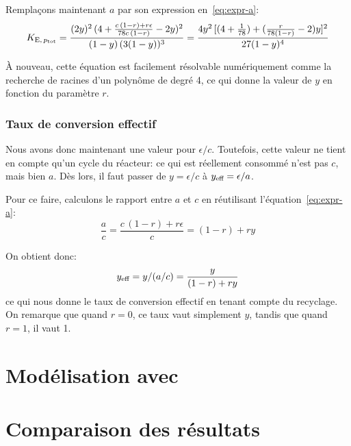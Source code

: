 Remplaçons maintenant $a$ par son expression en~\ref{eq:expr-a}:
\begin{equation*}
    K_{\mathrm{E},\,p_{\mbox{\tiny{tot}}}}
    = \frac{(2y)^2\,(4 + \frac{c\,(1-r) + r\epsilon}{78c\,(1-r)} - 2y)^2}
    {(1-y)\,(3(1-y))^3}
    = \frac{4y^2\,[(4 + \frac{1}{78}) + (\frac{r}{78(1-r)} - 2)y]^2}
    {27(1-y)^4}
\end{equation*}

À nouveau, cette équation est facilement résolvable numériquement
comme la recherche de racines d'un polynôme de degré 4,
ce qui donne la valeur de $y$ en fonction du paramètre $r$.

\subsubsection{Taux de conversion effectif}

Nous avons donc maintenant une valeur pour $\epsilon/c$.
Toutefois, cette valeur ne tient en compte qu'un cycle du réacteur:
ce qui est réellement consommé n'est pas $c$, mais bien $a$.
Dès lors, il faut passer de $y = \epsilon/c$ à $y_{\mbox{\scriptsize{eff}}} = \epsilon/a$.

Pour ce faire, calculons le rapport entre $a$ et $c$
en réutilisant l'équation~\ref{eq:expr-a}:
\begin{equation}
    \frac{a}{c} = \frac{c\,(1-r) + r\epsilon}{c} = (1-r) + ry
\end{equation}

On obtient donc:
\begin{equation}
    y_{\mbox{\scriptsize{eff}}} = y / (a/c) = \frac{y}{(1-r) + ry}
\end{equation}
ce qui nous donne le taux de conversion effectif
en tenant compte du recyclage.
On remarque que quand $r=0$, ce taux vaut simplement $y$,
tandis que quand $r=1$, il vaut 1.

\section{Modélisation avec \aspen}

\section{Comparaison des résultats}
